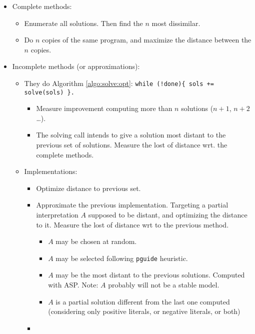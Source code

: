 \documentclass[a4paper,10pt]{article}
\begin{document}
\begin{itemize}
\item
Complete methods:
\begin{itemize}
    \item
    Enumerate all solutions. Then find the $n$ most dissimilar.
    \item
    Do $n$ copies of the same program, and maximize the distance between the $n$ copies.
\end{itemize}
\item
Incomplete methods (or approximations):
\begin{itemize}
    \item
    They do Algorithm \ref{algo:solve:opt}:  
    \verb|while (!done){ sols += solve(sols) }.|
    \begin{itemize}
        \item
        Measure improvement computing more than $n$ solutions ($n+1$, $n+2$\ldots).
        \item
        The solving call intends to give a solution most distant to the previous 
        set of solutions. Measure the lost of distance wrt. the complete methods.
    \end{itemize}
    \item
    Implementations:
    \begin{itemize}
        \item
        Optimize distance to previous set. %
        \item
        Approximate the previous implementation. 
        Targeting a partial interpretation $A$ supposed to be distant, 
        and optimizing the distance to it.%
        Measure the lost of distance wrt to the previous method.
        \begin{itemize}
            \item
            $A$ may be chosen at random.
            \item
            $A$ may be selected following \verb|pguide| heuristic.
            \item
            $A$ may be the most distant to the previous solutions. Computed with ASP.
            Note: $A$ probably will not be a stable model.
            \item
            $A$ is a partial solution different from the last one computed 
            (considering only positive literals, or negative literals, or both)
        \end{itemize}
        \item

\end{itemize}
\end{itemize}
\end{itemize}
\end{document}
